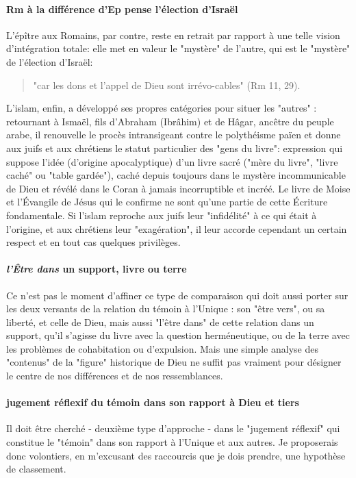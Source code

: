 \paragraph{Rm à la différence d'Ep pense l'élection d'Israël}
L'épître aux Romains, par contre, reste en retrait par rapport à une telle vision d'intégration totale: elle met en valeur le "mystère" de l'autre, qui est le "mystère" de l'élection d'Israël: 
\begin{quote}
    "car les dons et l'appel de Dieu sont irrévo-cables" (Rm 11, 29).
\end{quote} 

L'islam, enfin, a développé ses propres catégories pour situer les "autres" : retournant à Ismaël, fils d'Abraham (Ibrâhim) et de Hâgar, ancêtre du peuple arabe, il renouvelle le procès intransigeant contre le polythéisme païen et donne aux juifs et aux chrétiens le statut particulier des "gens du livre": expression qui suppose l'idée (d'origine apocalyptique) d'un livre sacré ("mère du livre", "livre caché" ou "table gardée"), caché depuis toujours dans le mystère incommunicable de Dieu et révélé dans le Coran à jamais incorruptible et incréé. Le livre de Moise et l'Évangile de Jésus qui le confirme ne sont qu'une partie de cette Écriture fondamentale. Si l'islam reproche aux juifs leur "infidélité" à ce qui était à l'origine, et aux chrétiens leur "exagération", il leur accorde cependant un certain respect et en tout cas quelques  privilèges.

\paragraph{\textit{l'Être dans} un support, livre ou terre}
Ce n'est pas le moment d'affiner ce type de comparaison qui doit aussi porter sur les deux versants de la relation du témoin à l'Unique : son "être vers", ou sa liberté, et celle de Dieu, mais aussi "l'être dans" de cette relation dans un support, qu'il s'agisse du livre avec la question herméneutique, ou de la terre avec les problèmes de cohabitation ou d'expulsion. Mais une simple analyse des "contenus" de la "figure" historique de Dieu ne suffit pas vraiment pour désigner le centre de nos différences et de nos ressemblances. 
\paragraph{jugement réflexif du témoin dans son rapport à Dieu et tiers}
Il doit être cherché - deuxième type d'approche - dans le "jugement réflexif" qui constitue le "témoin" dans son rapport à l'Unique et aux autres. Je proposerais donc volontiers, en m'excusant des raccourcis que je dois prendre, une hypothèse de classement.

